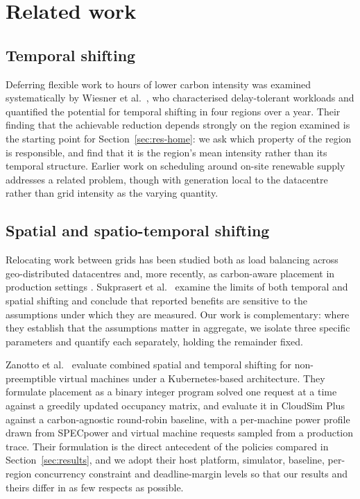 \section{Related work}
\label{sec:related}

\subsection{Temporal shifting}

Deferring flexible work to hours of lower carbon intensity was examined
systematically by Wiesner et al.~\cite{wiesner2021letswait}, who characterised
delay-tolerant workloads and quantified the potential for temporal shifting in
four regions over a year. Their finding that the achievable reduction depends
strongly on the region examined is the starting point for
Section~\ref{sec:res-home}: we ask which property of the region is responsible,
and find that it is the region's mean intensity rather than its temporal
structure. Earlier work on scheduling around on-site renewable supply
\cite{goiri2011greenslot,grange2018greenit} addresses a related problem, though
with generation local to the datacentre rather than grid intensity as the
varying quantity.

\subsection{Spatial and spatio-temporal shifting}

Relocating work between grids has been studied both as load balancing across
geo-distributed datacentres \cite{zhou2013carbonaware} and, more recently, as
carbon-aware placement in production settings
\cite{radovanovic2023carbonaware,souza2023casper}. Sukprasert et
al.~\cite{sukprasert2023spatiotemporal,sukprasert2024limitations} examine the
limits of both temporal and spatial shifting and conclude that reported benefits are sensitive to the
assumptions under which they are measured. Our work is complementary: where they
establish that the assumptions matter in aggregate, we isolate three specific
parameters and quantify each separately, holding the remainder fixed.

Zanotto et al.~\cite{zanotto2025usercentric} evaluate combined spatial and
temporal shifting for non-preemptible virtual machines under a Kubernetes-based
architecture. They formulate placement as a binary integer program solved one
request at a time against a greedily updated occupancy matrix, and evaluate it in
CloudSim Plus against a carbon-agnostic round-robin baseline, with a per-machine
power profile drawn from SPECpower and virtual machine requests sampled from a
production trace. Their formulation is the direct antecedent of the policies
compared in Section~\ref{sec:results}, and we adopt their host platform,
simulator, baseline, per-region concurrency constraint and deadline-margin levels
so that our results and theirs differ in as few respects as possible.

